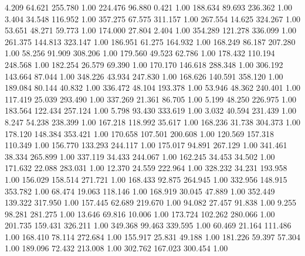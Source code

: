   4.209   64.621  255.780         1.00
 224.476   96.880    0.421         1.00
 188.634   89.693  236.362         1.00
   3.404   34.548  116.952         1.00
 357.275   67.575  311.157         1.00
 267.554   14.625  324.267         1.00
  53.651   48.271   59.773         1.00
 174.000   27.804    2.404         1.00
 354.289  121.278  336.099         1.00
 261.375  144.813  323.147         1.00
 186.951   61.275  164.932         1.00
 168.249   86.187  207.280         1.00
  58.256   91.909  308.206         1.00
 179.560   49.523   62.786         1.00
 178.432  110.194  248.568         1.00
 182.254   26.579   69.390         1.00
 170.170  146.618  288.348         1.00
 306.192  143.664   87.044         1.00
 348.226   43.934  247.830         1.00
 168.626  140.591  358.120         1.00
 189.084   80.144   40.832         1.00
 336.472   48.104  193.378         1.00
  53.946   48.362  240.401         1.00
 117.419   25.039  293.490         1.00
 337.269   21.361   86.705         1.00
   5.199   48.250  226.975         1.00
 183.564  122.434  257.124         1.00
   5.798   93.430  333.619         1.00
   3.032   40.594  231.439         1.00
   8.247   54.238  238.399         1.00
 167.218  118.992   35.617         1.00
 168.236   31.738  304.373         1.00
 178.120  148.384  353.421         1.00
 170.658  107.501  200.608         1.00
 120.569  157.318  110.349         1.00
 156.770  133.293  244.117         1.00
 175.017   94.891  267.129         1.00
 341.461   38.334  265.899         1.00
 337.119   34.433  244.067         1.00
 162.245   34.453   34.502         1.00
 171.632   22.088  283.031         1.00
  12.370   24.559  222.964         1.00
 328.232   34.231  193.958         1.00
 156.029  158.514  271.721         1.00
 168.433   92.875  264.945         1.00
 332.956  148.915  353.782         1.00
  68.474   19.063  118.146         1.00
 168.919   30.045   47.889         1.00
 352.449  139.322  317.950         1.00
 157.445   62.689  219.670         1.00
  94.082   27.457   91.838         1.00
   9.255   98.281  281.275         1.00
  13.646   69.816   10.006         1.00
 173.724  102.262  280.066         1.00
 201.735  159.431  326.211         1.00
 349.368   99.463  339.595         1.00
  60.469   21.164  111.486         1.00
 168.410   78.114  272.684         1.00
 155.917   25.831   49.188         1.00
 181.226   59.397   57.304         1.00
 189.096   72.432  213.008         1.00
 302.762  167.023  300.454         1.00
